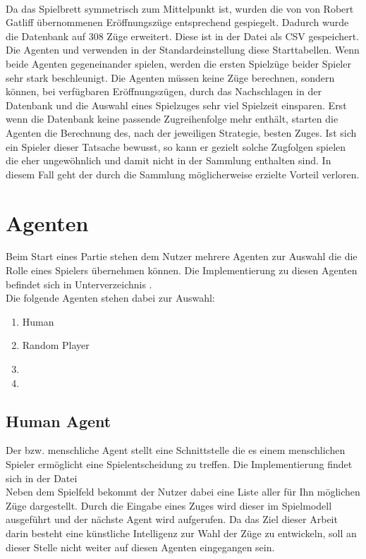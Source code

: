 \\Da das Spielbrett symmetrisch zum Mittelpunkt ist, wurden die von von Robert Gatliff \cite{open1} übernommenen Eröffnungszüge entsprechend gespiegelt. Dadurch wurde die Datenbank auf 308 Züge erweitert. Diese ist in der Datei  als CSV gespeichert.
\\Die Agenten \mxZitat{\mc} und \mxZitat{\abp} verwenden in der Standardeinstellung diese Starttabellen. Wenn beide Agenten gegeneinander spielen, werden die ersten Spielzüge beider Spieler sehr stark beschleunigt. Die Agenten müssen keine Züge berechnen, sondern können, bei verfügbaren Eröffnungszügen, durch das Nachschlagen in der Datenbank und die Auswahl eines Spielzuges sehr viel Spielzeit einsparen. Erst wenn die Datenbank keine passende Zugreihenfolge mehr enthält, starten die Agenten die Berechnung des, nach der jeweiligen Strategie, besten Zuges. Ist sich ein Spieler dieser Tatsache bewusst, so kann er gezielt solche Zugfolgen spielen die eher ungewöhnlich und damit nicht in der Sammlung enthalten sind. In diesem Fall geht der durch die Sammlung möglicherweise erzielte Vorteil verloren.
\section{Agenten}
\label{agenten}
Beim Start eines Partie stehen dem Nutzer mehrere Agenten zur Auswahl die die Rolle eines Spielers übernehmen können. Die Implementierung zu diesen Agenten befindet sich in Unterverzeichnis .
\\Die folgende Agenten stehen dabei zur Auswahl:
\begin{enumerate}
\item Human
\item Random Player
\item \mc
\item \abp
\end{enumerate}
\subsection{Human Agent}
Der  bzw. menschliche Agent stellt eine Schnittstelle die es einem menschlichen Spieler ermöglicht eine Spielentscheidung zu treffen. Die Implementierung findet sich in der Datei 
\\Neben dem Spielfeld bekommt der Nutzer dabei eine Liste aller für Ihn möglichen Züge dargestellt. Durch die Eingabe eines Zuges wird dieser im Spielmodell ausgeführt und der nächste Agent wird aufgerufen. Da das Ziel dieser Arbeit darin besteht eine künstliche Intelligenz zur Wahl der Züge zu entwickeln, soll an dieser Stelle nicht weiter auf diesen Agenten eingegangen sein.

